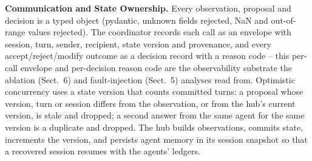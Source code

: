 \documentclass[runningheads]{llncs}
\begin{document}
\textbf{Communication and State Ownership.} Every observation, proposal and decision is a typed object (pydantic, unknown fields rejected, NaN and out-of-range values rejected). The coordinator records each call as an envelope with session, turn, sender, recipient, state version and provenance, and every accept/reject/modify outcome as a decision record with a reason code -- this per-call envelope and per-decision reason code are the observability substrate the ablation (Sect.~6) and fault-injection (Sect.~5) analyses read from. Optimistic concurrency uses a state version that counts committed turns: a proposal whose version, turn or session differs from the observation, or from the hub's current version, is stale and dropped; a second answer from the same agent for the same version is a duplicate and dropped. The hub builds observations, commits state, increments the version, and persists agent memory in its session snapshot so that a recovered session resumes with the agents' ledgers.
\end{document}
